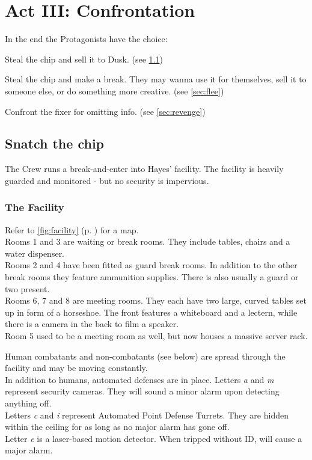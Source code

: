 \chapter{Act III: Confrontation}
\label{ch:act3}
In the end the Protagonists have the choice:
\begin{sitemize}
	\item Steal the chip and sell it to Dusk.
		(see \ref{sec:steal})
	\item Steal the chip and make a break.
		They may wanna use it for themselves,
		sell it to someone else,
		or do something more creative.
		(see \ref{sec:flee})
	\item Confront the fixer for omitting info.
		(see \ref{sec:revenge})
\end{sitemize}

\section{Snatch the chip}
\label{sec:steal}
The Crew runs a break-and-enter into Hayes' facility.
The facility is heavily guarded and monitored
	- but no security is impervious.
\subsection*{The Facility}
Refer to \ref{fig:facility} (p. \pageref{fig:facility}) for a map.\\
Rooms 1 and 3 are waiting or break rooms.
They include tables, chairs and a water dispenser.
\\%
Rooms 2 and 4 have been fitted as guard break rooms.
In addition to the other break rooms they feature ammunition supplies.
There is also usually a guard or two present.
\\%
Rooms 6, 7 and 8 are meeting rooms.
They each have two large, curved tables set up in form of a horseshoe.
The front features a whiteboard and a lectern,
	while there is a camera in the back to film a speaker.
\\%
Room 5 used to be a meeting room as well,
	but now houses a massive server rack.
%
\par
%
Human combatants and non-combatants (see below) are spread through the facility
	and may be moving constantly.
\\%
In addition to humans,
	automated defenses are in place.
Letters \emph{a} and \emph{m} represent security cameras.
They will sound a minor alarm upon detecting anything off.
\\%
Letters \emph{c} and \emph{i} represent Automated Point Defense Turrets.
They are hidden within the ceiling for as long as no major alarm has gone off.
\\%
Letter \emph{e} is a laser-based motion detector.
When tripped without ID,
	will cause a major alarm.
